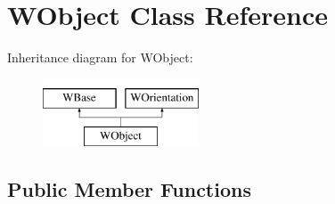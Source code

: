 \hypertarget{class_w_object}{}\section{W\+Object Class Reference}
\label{class_w_object}
Inheritance diagram for W\+Object\+:\begin{figure}[H]
\begin{center}
\leavevmode
\includegraphics[height=2.000000cm]{class_w_object}
\end{center}
\end{figure}
\subsection*{Public Member Functions}
